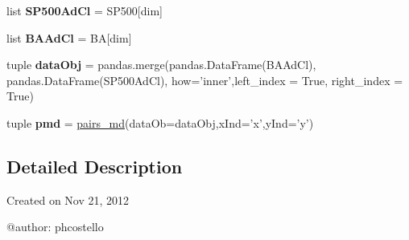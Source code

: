 \begin{DoxyCompactItemize}
\item 
\hypertarget{namespacestrategy__tester_1_1market__data_a72dfe95d13f68eb478f7b72a41b66784}{list {\bfseries \-S\-P500\-Ad\-Cl} = \-S\-P500\mbox{[}dim\mbox{]}}\label{namespacestrategy__tester_1_1market__data_a72dfe95d13f68eb478f7b72a41b66784}

\item 
\hypertarget{namespacestrategy__tester_1_1market__data_a2705e57cc2b3bdd5f5edefe7ff145168}{list {\bfseries \-B\-A\-Ad\-Cl} = \-B\-A\mbox{[}dim\mbox{]}}\label{namespacestrategy__tester_1_1market__data_a2705e57cc2b3bdd5f5edefe7ff145168}

\item 
\hypertarget{namespacestrategy__tester_1_1market__data_a368a35e5051f43f2164876b4cd42fe3d}{tuple {\bfseries data\-Obj} = pandas.\-merge(pandas.\-Data\-Frame(\-B\-A\-Ad\-Cl), pandas.\-Data\-Frame(\-S\-P500\-Ad\-Cl), how='inner',left\-\_\-index = \-True, right\-\_\-index = \-True)}\label{namespacestrategy__tester_1_1market__data_a368a35e5051f43f2164876b4cd42fe3d}

\item 
\hypertarget{namespacestrategy__tester_1_1market__data_ac69252bead44bd7d0073037bb0d47175}{tuple {\bfseries pmd} = \hyperlink{classstrategy__tester_1_1market__data_1_1pairs__md}{pairs\-\_\-md}(data\-Ob=data\-Obj,x\-Ind='x',y\-Ind='y')}\label{namespacestrategy__tester_1_1market__data_ac69252bead44bd7d0073037bb0d47175}

\end{DoxyCompactItemize}


\subsection{\-Detailed \-Description}
\begin{DoxyVerb}
Created on Nov 21, 2012

@author: phcostello
\end{DoxyVerb}
 